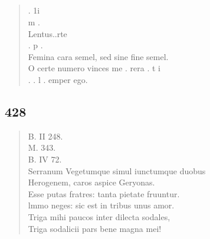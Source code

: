 \documentclass[11pt, a4paper]{report}
\begin{document}
            \subsection*{}
      \begin{verse}
      . 1i \\ m . \\ Lentus..rte \\ . p . \\ Femina cara semel, sed sine fine semel. \\ O certe numero vinces me . rera . t i \\ . . l . emper ego. \\ 
      \end{verse}
  
            \subsection*{428}
      \begin{verse}
      B. II 248. \\ M. 343. \\ B. IV 72. \\ Serranum Vegetumque simul iunctumque duobus \\ Herogenem, caros aspice Geryonas. \\ Esse putas fratres: tanta pietate fruuntur. \\ lmmo neges: sic est in tribus unus amor. \\ Triga mihi paucos inter dilecta sodales, \\ Triga sodalicii pars bene magna mei! \\ 
      \end{verse}
  
\end{document}

